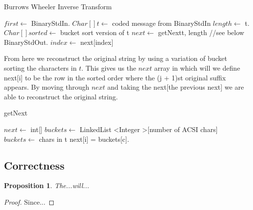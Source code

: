 \documentclass[12pt]{article}
\newtheorem{proposition}[theorem]{Proposition}
\begin{document}
\begin{algorithm} [H]
\caption {Burrows Wheeler Inverse Transform}
\begin{algorithmic}
	\State $first \gets$ BinaryStdIn.
	\State $Char[]t \gets$ coded message from BinaryStdIn
	\State $length \gets$ t.
	\State $Char[] sorted \gets$ bucket sort version of t
	\State $next \gets$ getNext{t, length} //see below
		\State BinaryStdOut.
		\State $index \gets$ next[index]
	\EndFor
\EndProcedure
\end{algorithmic}
\end{algorithm}

From here we reconstruct the original string by using a variation of bucket
sorting the characters in $t$. This gives us the $next$ array in which will
we define next[i] to be the row in the sorted order where the (j + 1)st original
suffix appears. By moving through $next$ and taking the next[the previous next]
we are able to reconstruct the original string.

\begin{algorithm} [H]
\caption {getNext}
\begin{algorithmic}
	\State $next \gets$ int[]
	\State $buckets \gets$ LinkedList \textless Integer \textgreater [number of ACSI chars]
	\State $buckets \gets$ chars in t
			\State next[i] = buckets[c].
		\EndWhile
	\EndFor
\EndProcedure
\end{algorithmic}
\end{algorithm}



\subsection{Correctness}

\begin{proposition}
	The...will...
\end{proposition}

\begin{proof}
	Since...
\end{proof}

\end{document}
